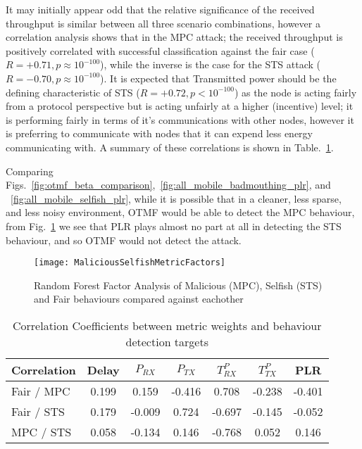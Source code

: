 It may initially appear odd that the relative significance of the received throughput is similar between all three scenario combinations, however a correlation analysis shows that in the MPC attack; the received throughput is positively correlated with successful classification against the fair case ($R=+0.71, p\approx10^{-100}$), while the inverse is the case for the STS attack ($R=-0.70, p\approx10^{-100}$).
It is expected that Transmitted power should be the defining characteristic of STS ($R=+0.72, p<10^{-100}$) as the node is acting fairly from a protocol perspective but is acting unfairly at a higher (incentive) level; it is performing fairly in terms of it's communications with other nodes, however it is preferring to communicate with nodes that it can expend less energy communicating with.
A summary of these correlations is shown in Table.~\ref{tab:correlations}.

Comparing Figs.~\ref{fig:otmf_beta_comparison},~\ref{fig:all_mobile_badmouthing_plr}, and ~\ref{fig:all_mobile_selfish_plr}, while it is possible that in a cleaner, less sparse, and less noisy environment, OTMF would be able to detect the MPC behaviour, from Fig.~\ref{fig:malselfactors} we see that PLR plays almost no part at all in detecting the STS behaviour, and so OTMF would not detect the attack.

\begin{figure}
	\centering
	\texttt{[image: MaliciousSelfishMetricFactors]}
	\caption{Random Forest Factor Analysis of Malicious (MPC), Selfish (STS) and Fair behaviours compared against eachother}
	\label{fig:malselfactors}
\end{figure}

\begin{table}[h]
	\caption{Correlation Coefficients between metric weights and behaviour detection targets} \label{tab:correlations}
	\begin{center}
		\begin{tabular}{lcccccc}
			\toprule
			Correlation      & Delay & $P_{RX}$ & $P_{TX}$ & $T^P_{RX}$ & $T^P_{TX}$ & PLR \\
			\midrule
			Fair / MPC       & 0.199 &  0.159   & -0.416  &  0.708   & -0.238   & -0.401\\
			Fair / STS       & 0.179 &  -0.009  &  0.724  & -0.697   & -0.145   & -0.052\\
			MPC / STS        & 0.058 &  -0.134  &  0.146  & -0.768   &  0.052   &  0.146\\
			\bottomrule
		\end{tabular}
	\end{center}
\end{table}

